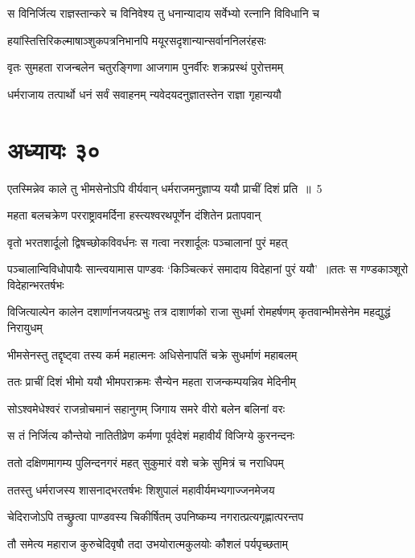 \twolineshloka
{स विनिर्जित्य राज्ञस्तान्करे च विनिवेश्य तु}
{धनान्यादाय सर्वेभ्यो रत्नानि विविधानि च}


\twolineshloka
{हयांस्तित्तिरिकल्माषाञ्शुकपत्रनिभानपि}
{मयूरसदृशान्यान्सर्वाननिलरंहसः}


\twolineshloka
{वृतः सुमहता राजन्बलेन चतुरङ्गिणा}
{आजगाम पुनर्वीरः शक्रप्रस्थं पुरोत्तमम्}


\twolineshloka
{धर्मराजाय तत्पार्थो धनं सर्वं सवाहनम्}
{न्यवेदयदनुज्ञातस्तेन राज्ञा गृहान्ययौ}


\chapter{अध्यायः ३०}
\twolineshloka
{एतस्मिन्नेव काले तु भीमसेनोऽपि वीर्यवान्}
{धर्मराजमनुज्ञाप्य ययौ प्राचीं दिशं प्रति ॥ 5}


\threelineshloka
{महता बलचक्रेण परराष्ट्रावमर्दिना}
{हस्त्यश्वरथपूर्णेन दंशितेन प्रतापवान्}
{}


\twolineshloka
{वृतो भरतशार्दूलो द्विषच्छोकविवर्धनः}
{स गत्वा नरशार्दूलः पञ्चालानां पुरं महत्}


\twolineshloka
{पञ्चालान्विविधोपायैः सान्त्वयामास पाण्डवः}
{`किञ्चित्करं समादाय विदेहानां पुरं ययौ' ॥ततः स गण्डकाञ्शूरो विदेहान्भरतर्षभः}


\fourlineindentedshloka
{विजित्याल्पेन कालेन दशार्णानजयत्प्रभुः}
{तत्र दाशार्णको राजा सुधर्मा रोमहर्षणम्}
{कृतवान्भीमसेनेम महद्युद्धं निरायुधम्}
{}


\twolineshloka
{भीमसेनस्तु तद्दृष्ट्वा तस्य कर्म महात्मनः}
{अधिसेनापतिं चक्रे सुधर्माणं महाबलम्}


\twolineshloka
{ततः प्राचीं दिशं भीमो ययौ भीमपराक्रमः}
{सैन्येन महता राजन्कम्पयन्निव मेदिनीम्}


\twolineshloka
{सोऽश्वमेधेश्वरं राजन्रोचमानं सहानुगम्}
{जिगाय समरे वीरो बलेन बलिनां वरः}


\twolineshloka
{स तं निर्जित्य कौन्तेयो नातितीव्रेण कर्मणा}
{पूर्वदेशं महावीर्यं विजिग्ये कुरनन्दनः}


\twolineshloka
{ततो दक्षिणमागम्य पुलिन्दनगरं महत्}
{सुकुमारं वशे चक्रे सुमित्रं च नराधिपम्}


\twolineshloka
{ततस्तु धर्मराजस्य शासनाद्भरतर्षभः}
{शिशुपालं महावीर्यमभ्यगाज्जनमेजय}


\twolineshloka
{चेदिराजोऽपि तच्छ्रुत्वा पाण्डवस्य चिकीर्षितम्}
{उपनिष्कम्य नगरात्प्रत्यगृह्णात्परन्तप}


\twolineshloka
{तौ समेत्य महाराज कुरुचेदिवृषौ तदा}
{उभयोरात्मकुलयोः कौशलं पर्यपृच्छताम्}


